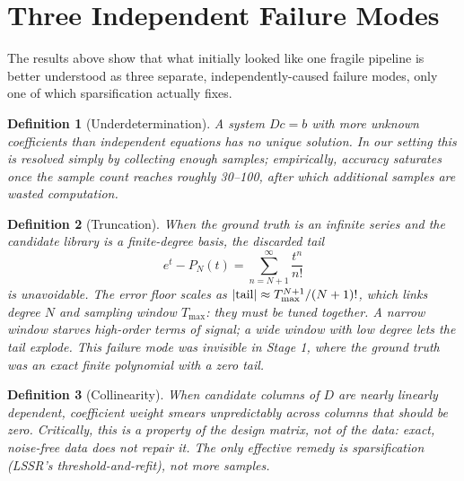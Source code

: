 \documentclass[11pt]{article}
\newtheorem{definition}{Definition}
\begin{document}
\section{Three Independent Failure Modes}

The results above show that what initially looked like one fragile pipeline is better
understood as three separate, independently-caused failure modes, only one of which
sparsification actually fixes.

\begin{definition}[Underdetermination]
A system $Dc = b$ with more unknown coefficients than independent equations has no
unique solution. In our setting this is resolved simply by collecting enough samples;
empirically, accuracy saturates once the sample count reaches roughly 30--100, after
which additional samples are wasted computation.
\end{definition}

\begin{definition}[Truncation]
When the ground truth is an infinite series and the candidate library is a finite-degree
basis, the discarded tail
\[
e^{t} - P_N(t) = \sum_{n=N+1}^{\infty} \frac{t^n}{n!}
\]
is unavoidable. The error floor scales as $|{\rm tail}| \approx T_{\max}^{N+1}/(N+1)!$,
which links degree $N$ and sampling window $T_{\max}$: they must be tuned together. A
narrow window starves high-order terms of signal; a wide window with low degree lets the
tail explode. This failure mode was invisible in Stage 1, where the ground truth was an
exact finite polynomial with a zero tail.
\end{definition}

\begin{definition}[Collinearity]
When candidate columns of $D$ are nearly linearly dependent, coefficient weight smears
unpredictably across columns that should be zero. Critically, this is a property of the
\emph{design matrix}, not of the data: exact, noise-free data does not repair it. The
only effective remedy is sparsification (LSSR's threshold-and-refit), not more samples.
\end{definition}
\end{document}
